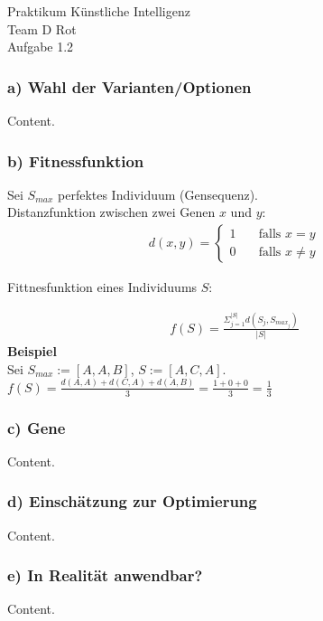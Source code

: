 \documentclass{beamer}
\begin{document}
\begin{frame}
  \begin{center}
    \Huge{Praktikum K\"unstliche Intelligenz} \\
    \vspace{1.5cm}
    \huge{Team D Rot} \\
    \vspace{1.5cm}
    \Large{Aufgabe 1.2}
  \end{center}
\end{frame}

\begin{frame}
  \frametitle{\textbf{a)} Wahl der Varianten/Optionen}
  Content.
\end{frame}

\begin{frame}
  \frametitle{\textbf{b)} Fitnessfunktion}

  Sei $S_{max}$ perfektes Individuum (Gensequenz). \\

  Distanzfunktion zwischen zwei Genen $x$ und $y$:
  \begin{align*}
    d(x,y) =
      \begin{cases}
        1 & \quad \text{falls } x = y \\
        0 & \quad \text{falls } x \neq y
      \end{cases}
  \end{align*}

  Fittnesfunktion eines Individuums $S$:

  \begin{align*}
    f(S) = \frac{\Sigma_{j=1}^{|S|} d(S_{j},S_{max_j})}
                {|S|}
  \end{align*}
  \textbf{Beispiel} \\
    \vspace{0.5cm}
    Sei $S_{max} := [ A, A, B ]$, $S := [A, C, A]$. \\
    \vspace{0.5cm}
    $f(S) = \frac{d(A,A) + d(C, A) + d(A, B)}{3}
           = \frac{1 + 0 + 0}{3} = \frac{1}{3}$
\end{frame}

\begin{frame}
  \frametitle{\textbf{c)} Gene}
  Content.
\end{frame}

\begin{frame}
  \frametitle{\textbf{d)} Einsch\"atzung zur Optimierung}
  Content.
\end{frame}

\begin{frame}
  \frametitle{\textbf{e)} In Realit\"at anwendbar?}
  Content.
\end{frame}
\end{document}
